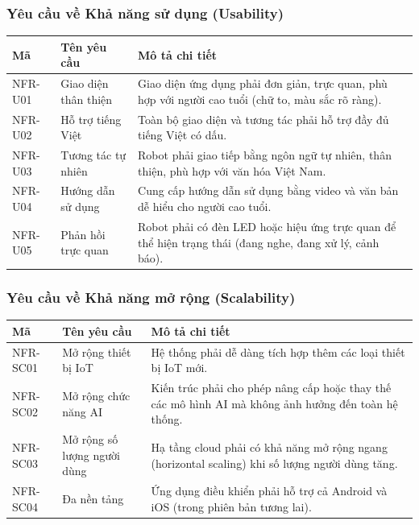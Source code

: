 \newpage
\subsubsection{Yêu cầu về Khả năng sử dụng (Usability)}

\begin{table}[h!]
\centering
\label{tab:nfr-use}
\begin{tabular}{|L{1.5cm}|L{3.5cm}|L{8.5cm}|}
\hline
\textbf{Mã} & \textbf{Tên yêu cầu} & \textbf{Mô tả chi tiết} \\
\hline
NFR-U01 & Giao diện thân thiện & Giao diện ứng dụng phải đơn giản, trực quan, phù hợp với người cao tuổi (chữ to, màu sắc rõ ràng). \\
\hline
NFR-U02 & Hỗ trợ tiếng Việt & Toàn bộ giao diện và tương tác phải hỗ trợ đầy đủ tiếng Việt có dấu. \\
\hline
NFR-U03 & Tương tác tự nhiên & Robot phải giao tiếp bằng ngôn ngữ tự nhiên, thân thiện, phù hợp với văn hóa Việt Nam. \\
\hline
NFR-U04 & Hướng dẫn sử dụng & Cung cấp hướng dẫn sử dụng bằng video và văn bản dễ hiểu cho người cao tuổi. \\
\hline
NFR-U05 & Phản hồi trực quan & Robot phải có đèn LED hoặc hiệu ứng trực quan để thể hiện trạng thái (đang nghe, đang xử lý, cảnh báo). \\
\hline
\end{tabular}
\end{table}
\subsubsection{Yêu cầu về Khả năng mở rộng (Scalability)}

\begin{table}[h!]
\centering
\label{tab:nfr-scale}
\begin{tabular}{|L{1.5cm}|L{3.5cm}|L{8.5cm}|}
\hline
\textbf{Mã} & \textbf{Tên yêu cầu} & \textbf{Mô tả chi tiết} \\
\hline
NFR-SC01 & Mở rộng thiết bị IoT & Hệ thống phải dễ dàng tích hợp thêm các loại thiết bị IoT mới. \\
\hline
NFR-SC02 & Mở rộng chức năng AI & Kiến trúc phải cho phép nâng cấp hoặc thay thế các mô hình AI mà không ảnh hưởng đến toàn hệ thống. \\
\hline
NFR-SC03 & Mở rộng số lượng người dùng & Hạ tầng cloud phải có khả năng mở rộng ngang (horizontal scaling) khi số lượng người dùng tăng. \\
\hline
NFR-SC04 & Đa nền tảng & Ứng dụng điều khiển phải hỗ trợ cả Android và iOS (trong phiên bản tương lai). \\
\hline
\end{tabular}
\end{table}

